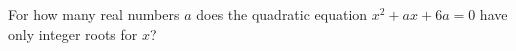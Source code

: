 For how many real numbers $a$ does the quadratic equation $x^2 + ax + 6a=0$ have only integer roots for $x$?